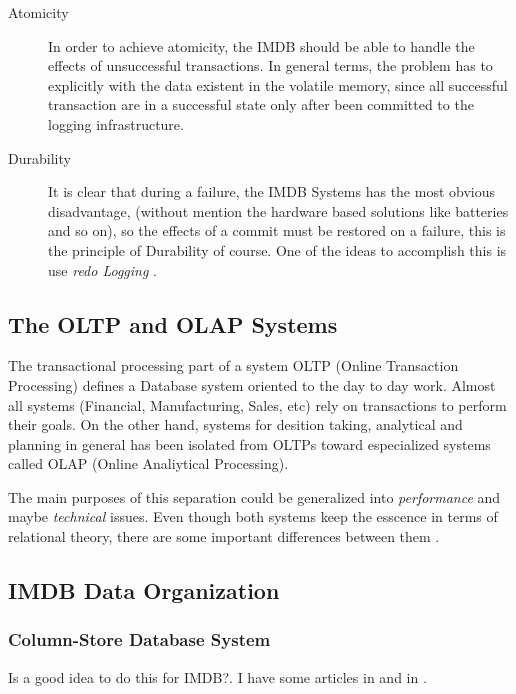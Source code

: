 \documentclass[10pt]{article} %
\begin{document}
\begin{description}
  \item[Atomicity] In order to achieve atomicity, the IMDB should be able to handle the effects of unsuccessful transactions. In general terms, the problem has to explicitly with the data existent in the volatile memory, since all successful transaction are in a successful state only after been committed to the logging infrastructure. %
  \item[Durability] It is clear that during a failure, the IMDB Systems has the most obvious disadvantage, (without mention the hardware based solutions like batteries and so on), so the effects of a commit must be restored on a failure, this is the principle of Durability of course. One of the ideas to accomplish this is use \emph{ redo Logging }. %
\end{description}

\subsection{The OLTP and OLAP Systems}
The transactional processing part of a system OLTP (Online Transaction Processing) defines a Database system oriented to the day to day work. Almost all systems (Financial, Manufacturing, Sales, etc) rely on transactions to perform their goals. On the other hand, systems for desition taking, analytical and planning in general has been isolated from OLTPs toward especialized systems called OLAP (Online Analiytical Processing).

The main purposes of this separation could be generalized into \emph{ performance } and maybe \emph{technical} issues. Even though both systems keep the esscence in terms of relational theory, there are some important differences between them \cite{Plattner}.



\subsection{IMDB Data Organization}
\subsubsection{Column-Store Database System}
Is a good idea to do this for IMDB?. I have some articles in \cite{ColumnOriented} and in \cite{ColumnOriented1}.
\end{document}
